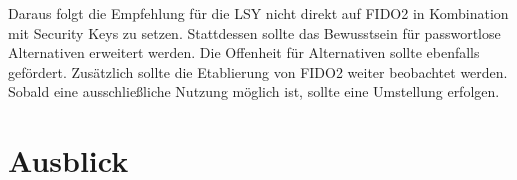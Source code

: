 Daraus folgt die Empfehlung für die \ac{LSY} nicht direkt auf FIDO2 in Kombination mit Security Keys zu setzen. Stattdessen sollte das Bewusstsein für passwortlose Alternativen erweitert werden. Die Offenheit für Alternativen sollte ebenfalls gefördert. Zusätzlich sollte die Etablierung von FIDO2 weiter beobachtet werden. Sobald eine ausschließliche Nutzung möglich ist, sollte eine Umstellung erfolgen.
\chapter{Ausblick}